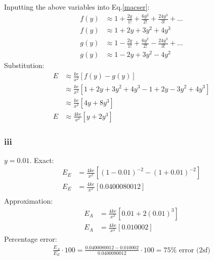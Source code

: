 \documentclass[11pt]{article}
\numberwithin{equation}{section}
\begin{document}
Inputting the above variables into Eq.\ref{macser}:
\begin{align}
	f(y) &\approx 1 + \frac{2 y}{1!} + \frac{6y^2}{2!} + \frac{24y^3}{3!} + ...\\
	f(y) &\approx 1 + 2y + 3y^2 + 4y^3 \\ 
	g(y) &\approx 1 - \frac{2 y}{1!} + \frac{6y^2}{2!} - \frac{24y^3}{3!} + ...\\
	g(y) &\approx 1 - 2y + 3y^2 - 4y^2
\end{align}
Substitution:
\begin{align}
	E &\approx \frac{ke}{x^2} \left[ f(y) - g(y)\right]\\
	&\approx \frac{ke}{x^2} \left[ 1 + 2y + 3y^2 + 4y^3 - 1 + 2y - 3y^2 + 4y^3 \right]\\
	&\approx \frac{ke}{x^2}\left[ 4y + 8y^3 \right]\\
	E &\approx \frac{4ke}{x^2}\left[ y + 2y^3 \right]
\end{align}
\subsubsection*{iii}
$y = 0.01$. Exact:
\begin{align}
	E_E &= \frac{4ke}{x^2} \left[\left(1-0.01\right)^{-2}-\left(1+0.01\right)^{-2}\right]\\
	E_E &= \frac{4ke}{x^2} \left[0.0400080012\right]\\
\end{align}
Approximation:
\begin{align}
	E_A &= \frac{4ke}{x^2} \left[0.01 + 2\left(0.01\right)^3\right]\\
	E_A &= \frac{4ke}{x^2} \left[0.010002\right]
\end{align}
Percentage error:
\begin{align}
	\frac{E_A}{E_E} \cdot 100 = \frac{0.0400080012 - 0.010002}{0.0400080012} \cdot 100 = 75\% \textrm{ error (2sf)}
\end{align}
\end{document}

